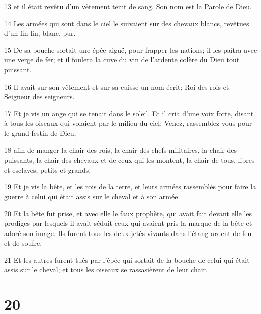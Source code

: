 \par 13 et il était revêtu d'un vêtement teint de sang. Son nom est la Parole de Dieu.
\par 14 Les armées qui sont dans le ciel le suivaient sur des chevaux blancs, revêtues d'un fin lin, blanc, pur.
\par 15 De sa bouche sortait une épée aiguë, pour frapper les nations; il les paîtra avec une verge de fer; et il foulera la cuve du vin de l'ardente colère du Dieu tout puissant.
\par 16 Il avait sur son vêtement et sur sa cuisse un nom écrit: Roi des rois et Seigneur des seigneurs.
\par 17 Et je vis un ange qui se tenait dans le soleil. Et il cria d'une voix forte, disant à tous les oiseaux qui volaient par le milieu du ciel: Venez, rassemblez-vous pour le grand festin de Dieu,
\par 18 afin de manger la chair des rois, la chair des chefs militaires, la chair des puissants, la chair des chevaux et de ceux qui les montent, la chair de tous, libres et esclaves, petits et grands.
\par 19 Et je vis la bête, et les rois de la terre, et leurs armées rassemblés pour faire la guerre à celui qui était assis sur le cheval et à son armée.
\par 20 Et la bête fut prise, et avec elle le faux prophète, qui avait fait devant elle les prodiges par lesquels il avait séduit ceux qui avaient pris la marque de la bête et adoré son image. Ils furent tous les deux jetés vivants dans l'étang ardent de feu et de soufre.
\par 21 Et les autres furent tués par l'épée qui sortait de la bouche de celui qui était assis sur le cheval; et tous les oiseaux se rassasièrent de leur chair.

\chapter{20}

